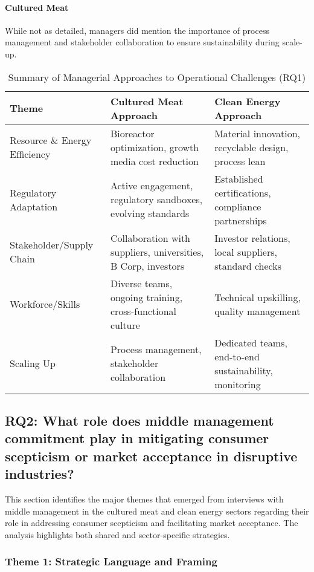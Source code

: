 \paragraph{Cultured Meat}
While not as detailed, managers did mention the importance of process management and stakeholder collaboration to ensure sustainability during scale-up.

\begin{table}[h!]
	\centering
	\caption{Summary of Managerial Approaches to Operational Challenges (RQ1)}
	\label{tab:rq1_summary}
	\begin{tabularx}{\textwidth}{@{}lXX@{}}
		\toprule
		\textbf{Theme} & \textbf{Cultured Meat Approach} & \textbf{Clean Energy Approach} \\
		\midrule
		Resource \& Energy Efficiency & Bioreactor optimization, growth media cost reduction & Material innovation, recyclable design, process lean \\
		\addlinespace
		Regulatory Adaptation & Active engagement, regulatory sandboxes, evolving standards & Established certifications, compliance partnerships \\
		\addlinespace
		Stakeholder/Supply Chain & Collaboration with suppliers, universities, B Corp, investors & Investor relations, local suppliers, standard checks \\
		\addlinespace
		Workforce/Skills & Diverse teams, ongoing training, cross-functional culture & Technical upskilling, quality management \\
		\addlinespace
		Scaling Up & Process management, stakeholder collaboration & Dedicated teams, end-to-end sustainability, monitoring \\
		\bottomrule
	\end{tabularx}
\end{table}

\subsection{RQ2: What role does middle management commitment play in mitigating consumer scepticism or market acceptance in disruptive industries?}
This section identifies the major themes that emerged from interviews with middle management in the cultured meat and clean energy sectors regarding their role in addressing consumer scepticism and facilitating market acceptance. The analysis highlights both shared and sector-specific strategies.

\subsubsection{Theme 1: Strategic Language and Framing}
